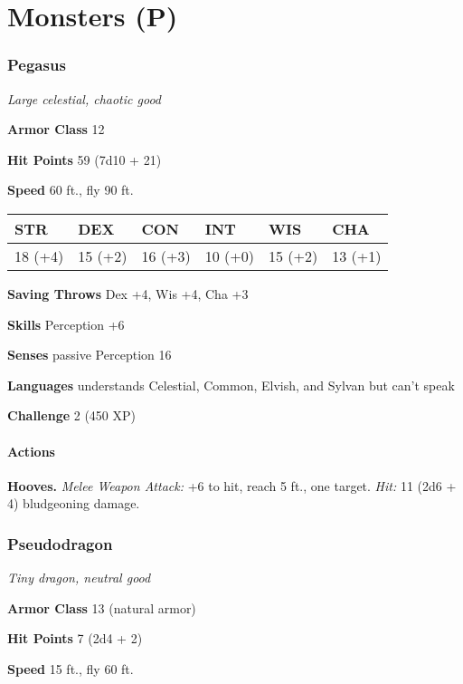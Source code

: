 \documentclass[
]{article}
\date{}
\begin{document}
\hypertarget{monsters-p}{%
\section{Monsters (P)}\label{monsters-p}}

\hypertarget{pegasus}{%
\subsubsection{Pegasus}\label{pegasus}}

\emph{Large celestial, chaotic good}

\textbf{Armor Class} 12

\textbf{Hit Points} 59 (7d10 + 21)

\textbf{Speed} 60 ft., fly 90 ft.

\begin{longtable}[]{@{}llllll@{}}
\toprule
STR & DEX & CON & INT & WIS & CHA\tabularnewline
\midrule
\endhead
18 (+4) & 15 (+2) & 16 (+3) & 10 (+0) & 15 (+2) & 13 (+1)\tabularnewline
\bottomrule
\end{longtable}

\textbf{Saving Throws} Dex +4, Wis +4, Cha +3

\textbf{Skills} Perception +6

\textbf{Senses} passive Perception 16

\textbf{Languages} understands Celestial, Common, Elvish, and Sylvan but
can't speak

\textbf{Challenge} 2 (450 XP)

\hypertarget{actions}{%
\paragraph{Actions}\label{actions}}

\textbf{Hooves.} \emph{Melee Weapon Attack:} +6 to hit, reach 5 ft., one
target. \emph{Hit:} 11 (2d6 + 4) bludgeoning damage.

\hypertarget{pseudodragon}{%
\subsubsection{Pseudodragon}\label{pseudodragon}}

\emph{Tiny dragon, neutral good}

\textbf{Armor Class} 13 (natural armor)

\textbf{Hit Points} 7 (2d4 + 2)

\textbf{Speed} 15 ft., fly 60 ft.
\end{document}
